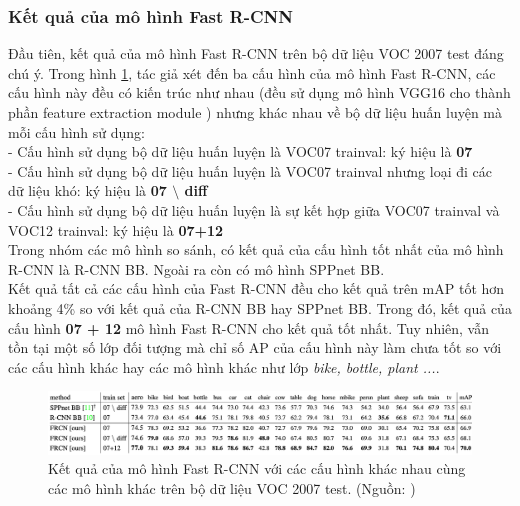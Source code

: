 {    \subsubsection{Kết quả của mô hình Fast R-CNN}
    Đầu tiên, kết quả của mô hình Fast R-CNN trên bộ dữ liệu VOC 2007 test đáng chú ý.
    Trong hình \ref{fig:fast_rcnn_results_1}, tác giả xét đến ba cấu hình của mô hình Fast R-CNN, các cấu hình này đều có kiến trúc như nhau (đều sử dụng mô hình VGG16 cho thành phần feature extraction module ) nhưng khác nhau về bộ dữ liệu huấn luyện mà mỗi cấu hình sử dụng: \\
    - Cấu hình sử dụng bộ dữ liệu huấn luyện là VOC07 trainval: ký hiệu là \textbf{07} \\
    - Cấu hình sử dụng bộ dữ liệu huấn luyện là VOC07 trainval nhưng loại đi các dữ liệu khó: ký hiệu là \textbf{07 $\setminus$ diff} \\
    - Cấu hình sử dụng bộ dữ liệu huấn luyện là sự kết hợp giữa VOC07 trainval và VOC12 trainval: ký hiệu là \textbf{07+12} \\
    Trong nhóm các mô hình so sánh, có kết quả của cấu hình tốt nhất của mô hình R-CNN là R-CNN BB.
    Ngoài ra còn có mô hình SPPnet BB. \\
    Kết quả tất cả các cấu hình của Fast R-CNN đều cho kết quả trên mAP tốt hơn khoảng 4\% so với kết quả của R-CNN BB hay SPPnet BB.
    Trong đó, kết quả của cấu hình \textbf{07 + 12} mô hình Fast R-CNN cho kết quả tốt nhất.
    Tuy nhiên, vẫn tồn tại một số lớp đối tượng  mà chỉ số AP của cấu hình này làm chưa tốt so với các cấu hình khác hay các mô hình khác như lớp \textit{bike, bottle, plant ...}.

    \begin{figure}[H]
        \centering
        \includegraphics[width=15cm] {images/fast_rcnn_results_1}
        \caption{Kết quả của mô hình Fast R-CNN với các cấu hình khác nhau cùng các mô hình khác trên bộ dữ liệu VOC 2007 test. (Nguồn: \cite{girshick2015fast})}
        \label{fig:fast_rcnn_results_1}
    \end{figure}

}
